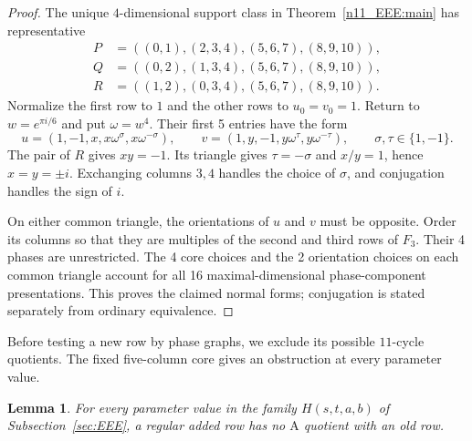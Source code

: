 \documentclass[11pt,a4paper]{article}
\newtheorem{lemma}[theorem]{Lemma}
\theoremstyle{plain}
\theoremstyle{definition}
\theoremstyle{plain}
\begin{document}
\begin{proof}
The unique $4$-dimensional support class in Theorem~\ref{n11_EEE:main} has representative
$$\begin{aligned}
P&=((0,1),(2,3,4),(5,6,7),(8,9,10)),\\
Q&=((0,2),(1,3,4),(5,6,7),(8,9,10)),\\
R&=((1,2),(0,3,4),(5,6,7),(8,9,10)).
\end{aligned}$$
Normalize the first row to $1$ and the other rows to $u_0=v_0=1$. Return to $w=e^{\pi i/6}$ and put $\omega=w^4$. Their first 5 entries have the form
$$u=(1,-1,x,x\omega^\sigma,x\omega^{-\sigma}),\qquad
v=(1,y,-1,y\omega^\tau,y\omega^{-\tau}),\qquad \sigma,\tau\in\{1,-1\}.$$
The pair of $R$ gives $xy=-1$. Its triangle gives $\tau=-\sigma$ and $x/y=1$, hence $x=y=\pm i$. Exchanging columns $3,4$ handles the choice of $\sigma$, and conjugation handles the sign of $i$.

On either common triangle, the orientations of $u$ and $v$ must be opposite. Order its columns so that they are multiples of the second and third rows of $F_3$. Their 4 phases are unrestricted. The 4 core choices and the 2 orientation choices on each common triangle account for all 16 maximal-dimensional phase-component presentations. This proves the claimed normal forms; conjugation is stated separately from ordinary equivalence.
\end{proof}

Before testing a new row by phase graphs, we exclude its possible $11$-cycle quotients. The fixed five-column core gives an obstruction at every parameter value.

\par\addvspace{\medskipamount}\noindent
\begin{minipage}{\linewidth}
\begin{lemma}\label{eee_generic:noA}
For every parameter value in the family $H(s,t,a,b)$ of Subsection~\ref{sec:EEE}, a regular added row has no $\mathrm{A}$ quotient with an old row.
\end{lemma}
\end{minipage}
\par\addvspace{\medskipamount}
\end{document}
